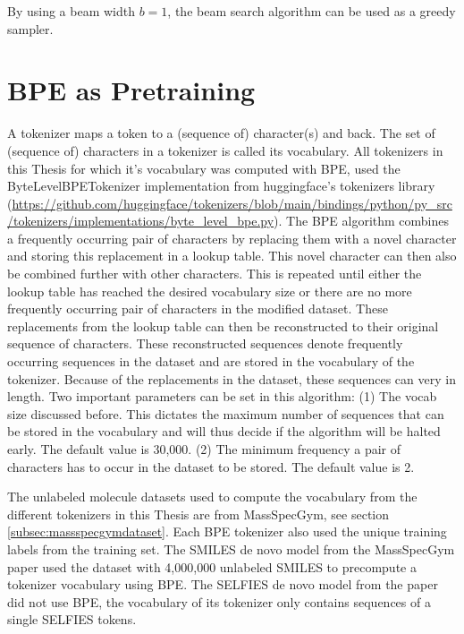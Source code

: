 By using a beam width $b=1$, the beam search algorithm can be used as a greedy sampler.

\section{BPE as Pretraining}
\label{sec:bpe}

A tokenizer maps a token to a (sequence of) character(s) and back. The set of (sequence of) characters in a tokenizer is called its vocabulary.
All tokenizers in this Thesis for which it's vocabulary was computed with \acf{BPE}, used the ByteLevelBPETokenizer implementation from huggingface's tokenizers library (\url{https://github.com/huggingface/tokenizers/blob/main/bindings/python/py_src/tokenizers/implementations/byte_level_bpe.py}).
The \ac{BPE} algorithm combines a frequently occurring pair of characters by replacing them with a novel character and storing this replacement in a lookup table.
This novel character can then also be combined further with other characters. 
This is repeated until either the lookup table has reached the desired vocabulary size or there are no more frequently occurring pair of characters in the modified dataset.
These replacements from the lookup table can then be reconstructed to their original sequence of characters.
These reconstructed sequences denote frequently occurring sequences in the dataset and are stored in the vocabulary of the tokenizer.
Because of the replacements in the dataset, these sequences can very in length.
Two important parameters can be set in this algorithm:
(1) The vocab size discussed before. This dictates the maximum number of sequences that can be stored in the vocabulary and will thus decide if the algorithm will be halted early. The default value is 30,000.
(2) The minimum frequency a pair of characters has to occur in the dataset to be stored. The default value is 2.

The unlabeled molecule datasets used to compute the vocabulary from the different tokenizers in this Thesis are from MassSpecGym, see section \ref{subsec:massspecgymdataset}.
Each \ac{BPE} tokenizer also used the unique training labels from the training set.
The SMILES de novo model from the MassSpecGym paper \cite{bushuiev2024massspecgym} used the dataset with 4,000,000 unlabeled SMILES to precompute a tokenizer vocabulary using \ac{BPE}.
The SELFIES de novo model from the paper did not use \ac{BPE}, the vocabulary of its tokenizer only contains sequences of a single SELFIES tokens.

